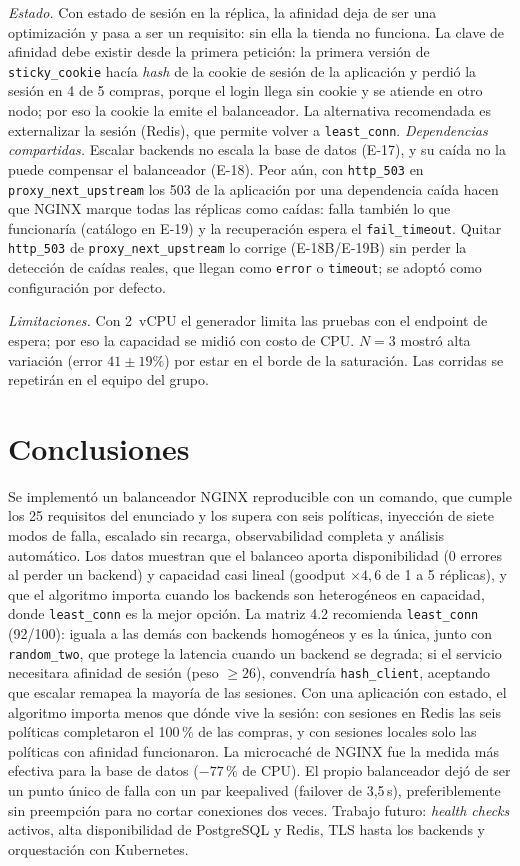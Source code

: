 \documentclass[conference]{IEEEtran}
\begin{document}
\emph{Estado.} Con estado de sesión en la réplica, la afinidad deja de ser una optimización y pasa a ser un requisito: sin ella la tienda no funciona. La clave de afinidad debe existir desde la primera petición: la primera versión de \texttt{sticky\_cookie} hacía \emph{hash} de la cookie de sesión de la aplicación y perdió la sesión en 4 de 5 compras, porque el login llega sin cookie y se atiende en otro nodo; por eso la cookie la emite el balanceador. La alternativa recomendada es externalizar la sesión (Redis), que permite volver a \texttt{least\_conn}. \emph{Dependencias compartidas.} Escalar backends no escala la base de datos (E-17), y su caída no la puede compensar el balanceador (E-18). Peor aún, con \texttt{http\_503} en \texttt{proxy\_next\_upstream} los 503 de la aplicación por una dependencia caída hacen que NGINX marque todas las réplicas como caídas: falla también lo que funcionaría (catálogo en E-19) y la recuperación espera el \texttt{fail\_timeout}. Quitar \texttt{http\_503} de \texttt{proxy\_next\_upstream} lo corrige (E-18B/E-19B) sin perder la detección de caídas reales, que llegan como \texttt{error} o \texttt{timeout}; se adoptó como configuración por defecto.

\emph{Limitaciones.} Con 2~vCPU el generador limita las pruebas con el endpoint de espera; por eso la capacidad se midió con costo de CPU. $N=3$ mostró alta variación (error $41\pm19\%$) por estar en el borde de la saturación. Las corridas se repetirán en el equipo del grupo.

\section{Conclusiones}
Se implementó un balanceador NGINX reproducible con un comando, que cumple los 25 requisitos del enunciado y los supera con seis políticas, inyección de siete modos de falla, escalado sin recarga, observabilidad completa y análisis automático. Los datos muestran que el balanceo aporta disponibilidad (0 errores al perder un backend) y capacidad casi lineal (goodput $\times4{,}6$ de 1 a 5 réplicas), y que el algoritmo importa cuando los backends son heterogéneos en capacidad, donde \texttt{least\_conn} es la mejor opción. La matriz 4.2 recomienda \texttt{least\_conn} (92/100): iguala a las demás con backends homogéneos y es la única, junto con \texttt{random\_two}, que protege la latencia cuando un backend se degrada; si el servicio necesitara afinidad de sesión (peso $\ge 26$), convendría \texttt{hash\_client}, aceptando que escalar remapea la mayoría de las sesiones. Con una aplicación con estado, el algoritmo importa menos que dónde vive la sesión: con sesiones en Redis las seis políticas completaron el 100\,\% de las compras, y con sesiones locales solo las políticas con afinidad funcionaron. La microcaché de NGINX fue la medida más efectiva para la base de datos ($-77$\,\% de CPU). El propio balanceador dejó de ser un punto único de falla con un par keepalived (failover de 3,5\,s), preferiblemente sin preempción para no cortar conexiones dos veces. Trabajo futuro: \emph{health checks} activos, alta disponibilidad de PostgreSQL y Redis, TLS hasta los backends y orquestación con Kubernetes.



\end{document}
